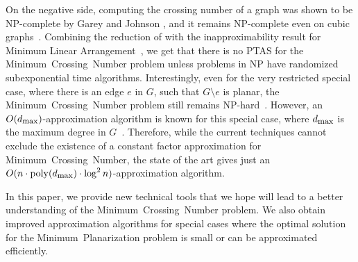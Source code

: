 \documentclass[twoside,leqno,twocolumn]{article}
\newcommand{\poly}{\operatorname{poly}}
\newcommand{\MP}{\mbox{\sf Minimum Planarization}\xspace}
\newcommand{\MCN}{\mbox{\sf Minimum Crossing Number}\xspace}
\newcommand{\dmax}{d_{\mbox{\textup{\footnotesize{max}}}}}
\begin{document}
\iffalse
Moreover, Ajtai et al.~\cite{ajtai82}, and independently Leighton \cite{leighton_book}, settling a conjecture of Erd\"{o}s and Guy \cite{erdos_guy73}, proved that every graph with $m\geq 4n$ edges has crossing number $\Omega(m^3/n^2)$, where $m$ is the number of graph's edges. Therefore, graphs whose average degree is higher than 8 have crossing number $\Omega(n)$.
\fi

On the negative side, computing the crossing number of a graph was shown to be NP-complete by Garey and Johnson \cite{crossing_np_complete}, and it remains NP-complete even on cubic graphs~\cite{Hlineny06a}.
Combining the reduction of \cite{crossing_np_complete} with the inapproximability result for Minimum Linear Arrangement~\cite{Ambuhl07}, we get that there is no PTAS for the \MCN problem unless problems in NP have randomized subexponential time algorithms.
Interestingly, even for the very restricted special case, where there is an edge $e$ in $G$, such that $G\setminus e$ is planar, the \MCN problem still remains NP-hard~\cite{cabello_edge}. However, an $O(\dmax)$-approximation algorithm is known for this special case, where $\dmax$ is the maximum degree in $G$~\cite{HlinenyS06}.
Therefore, while the current techniques cannot exclude the existence of a constant factor approximation for \MCN, the state of the art gives just an $O(n \cdot\poly(\dmax)\cdot \log^2 n)$-approximation algorithm. 
\iffalse
While the approximability of the problem is still widely open in general, arguably the most interesting regime is when the crossing number of the graph is small. The following is therefore a central open problem in topological graph theory:
\begin{quote}
\emph{
What is the best possible efficient algorithm for the \MCN problem, when the optimum is small?
}
\end{quote}

This problem has been explicitly stated by Sz\'{e}kely \cite{szekely_survey}, and emphasized by Kolman and Matou\v{s}ek \cite{KolmanM04}.
\fi

In this paper, we provide new technical tools that we hope will lead to a better understanding of the \MCN problem. We also obtain improved approximation algorithms for special cases where the optimal solution for the \MP problem is small or can be approximated efficiently.
\end{document}
